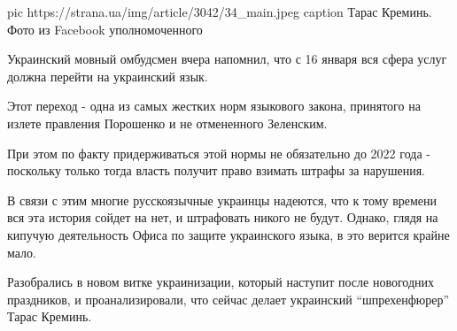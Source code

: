  
 
 
 
 
\ifcmt
pic https://strana.ua/img/article/3042/34_main.jpeg
caption Тарас Креминь. Фото из Facebook уполномоченного
\fi

Украинский мовный омбудсмен вчера напомнил, что с 16 января вся сфера услуг
должна перейти на украинский язык. 

Этот переход - одна из самых жестких норм языкового закона, принятого на излете
правления Порошенко и не отмененного Зеленским. 

При этом по факту придерживаться этой нормы не обязательно до 2022 года -
поскольку только тогда власть получит право взимать штрафы за нарушения. 

В связи с этим многие русскоязычные украинцы надеются, что к тому времени вся
эта история сойдет на нет, и штрафовать никого не будут. Однако, глядя на
кипучую деятельность Офиса по защите украинского языка, в это верится крайне
мало. 

Разобрались в новом витке украинизации, который наступит после новогодних
праздников, и проанализировали, что сейчас делает украинский \enquote{шпрехенфюрер}
Тарас Креминь. 

